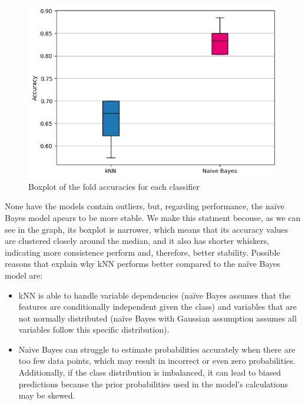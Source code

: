 \documentclass[12pt]{article}
\begin{document}
    \vspace{20pt}
    

        \begin{figure}[H]
            \centering
            \includegraphics[width=12cm]{./Part II/1_a.png}
            \caption{Boxplot of the fold accuracies for each classifier}
        \end{figure}

    \vspace{20pt}

    None have the models contain outliers, but, regarding performance, the naïve Bayes model apears to be more stable. We make this statment becouse, as we can see in the graph, its boxplot is narrower, which means that its accuracy values are clustered closely around the median, and it also has shorter whiskers, indicating more consistence perform and, therefore, better stability.
    Possible reasons that explain why kNN performs better compared to the naïve Bayes model are:
    \begin{itemize}
        \item kNN is able to handle variable dependencies (naïve Bayes assumes that the features are conditionally independent given the class) and variables that are not normally distributed (naïve Bayes with Gaussian assumption assumes all variables follow this specific distribution).
        \item Naive Bayes can struggle to estimate probabilities accurately when there are too few data points, which may result in incorrect or even zero probabilities. Additionally, if the class distribution is imbalanced, it can lead to biased predictions because the prior probabilities used in the model's calculations may be skewed.
    \end{itemize}
\end{document}
